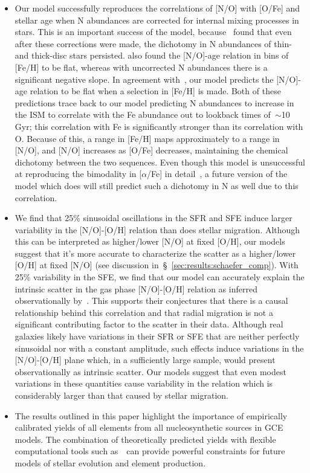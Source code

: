 \documentclass[ms.tex]{subfiles}
\begin{document}
\begin{itemize}
	\item Our model successfully reproduces the correlations of [N/O] 
	with [O/Fe] and stellar age when N abundances are corrected for internal 
	mixing processes in stars. 
	This is an important success of the model, because~\citet{Vincenzo2021} 
	found that even after these corrections were made, the dichotomy in N 
	abundances of thin- and thick-disc stars persisted. 
	\citet{Vincenzo2021} also found the [N/O]-age relation in bins of [Fe/H] to 
	be flat, whereas with uncorrected N abundances there is a significant 
	negative slope. 
	In agreement with~\citet{Vincenzo2021}, our model predicts the [N/O]-age 
	relation to be flat when a selection in [Fe/H] is made. 
	Both of these predictions trace back to our model predicting N abundances 
	to increase in the ISM to correlate with the Fe abundance out to lookback 
	times of~$\sim$10 Gyr; this correlation with Fe is significantly stronger 
	than its correlation with O. 
	Because of this, a range in [Fe/H] maps approximately to a range in [N/O], 
	and [N/O] increases as [O/Fe] decreases, maintaining the chemical 
	dichotomy between the two sequences. 
	Even though this model is unsuccessful at reproducing the bimodality in 
	[$\alpha$/Fe] in detail~\citep{Johnson2021}, a future version of the model 
	which does will still predict such a dichotomy in N as well due to this 
	correlation. 

	\item We find that 25\% sinusoidal oscillations in the SFR and SFE induce 
	larger variability in the [N/O]-[O/H] relation than does stellar migration. 
	Although this can be interpreted as higher/lower [N/O] at fixed [O/H], our 
	models suggest that it's more accurate to characterize the scatter as a 
	higher/lower [O/H] at fixed [N/O] (see discussion 
	in~\S~\ref{sec:results:schaefer_comp}). 
	With 25\% variability in the SFE, we find that our model can accurately 
	explain the intrinsic scatter in the gas phase [N/O]-[O/H] relation as 
	inferred observationally by~\citet{Schaefer2020}. 
	This supports their conjectures that there is a causal relationship behind 
	this correlation and that radial migration is not a significant 
	contributing factor to the scatter in their data. 
	Although real galaxies likely have variations in their SFR or SFE that are 
	neither perfectly sinusoidal nor with a constant amplitude, such effects 
	induce variations in the [N/O]-[O/H] plane which, in a sufficiently large 
	sample, would present observationally as intrinsic scatter.  
	Our models suggest that even {\color{red} modest} variations in these 
	quantities cause variability in the relation which is considerably larger 
	than that caused by stellar migration. 

	\item The results outlined in this paper highlight the importance of 
	empirically calibrated yields of all elements from all nucleosynthetic 
	sources in GCE models. 
	The combination of theoretically predicted yields with flexible 
	computational tools such as~\vice~can provide powerful constraints for 
	future models of stellar evolution and element production. 
\end{itemize} 
\end{document}
